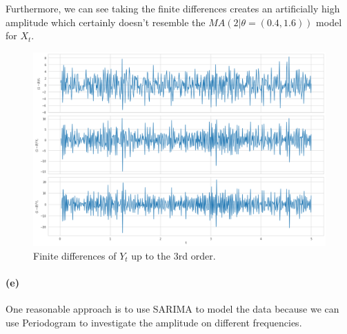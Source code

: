 \documentclass[11pt, letterpaper]{article}
\begin{document}
Furthermore, we can see taking the finite differences creates an artificially high amplitude which certainly doesn't resemble the $MA(2|\theta=(0.4, 1.6))$ model for $X_t$.
\begin{figure}[!h]
  \centering
  \includegraphics[width=1.0\textwidth]{plot3.png}
  \captionsetup{justification=centering}
  \caption{Finite differences of $Y_t$ up to the 3rd order.}
  \label{fig:truth_plus_noise}
\end{figure}

\paragraph{(e)}
One reasonable approach is to use SARIMA to model the data because we can use Periodogram to investigate the amplitude on different frequencies.
\end{document}
